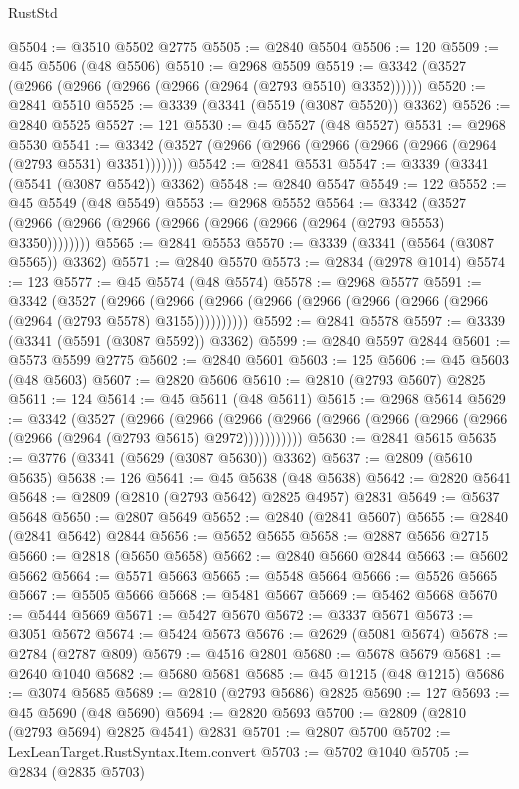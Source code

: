 \begin{lexlean}{RustStd}
\begin{coremodule}
@5504 := @3510 @5502 @2775
@5505 := @2840 @5504
@5506 := 120
@5509 := @45 @5506 (@48 @5506)
@5510 := @2968 @5509
@5519 := @3342 (@3527 (@2966 (@2966 (@2966 (@2966 (@2964 (@2793 @5510) @3352))))))
@5520 := @2841 @5510
@5525 := @3339 (@3341 (@5519 (@3087 @5520)) @3362)
@5526 := @2840 @5525
@5527 := 121
@5530 := @45 @5527 (@48 @5527)
@5531 := @2968 @5530
@5541 := @3342 (@3527 (@2966 (@2966 (@2966 (@2966 (@2966 (@2964 (@2793 @5531) @3351)))))))
@5542 := @2841 @5531
@5547 := @3339 (@3341 (@5541 (@3087 @5542)) @3362)
@5548 := @2840 @5547
@5549 := 122
@5552 := @45 @5549 (@48 @5549)
@5553 := @2968 @5552
@5564 := @3342 (@3527 (@2966 (@2966 (@2966 (@2966 (@2966 (@2966 (@2964 (@2793 @5553) @3350))))))))
@5565 := @2841 @5553
@5570 := @3339 (@3341 (@5564 (@3087 @5565)) @3362)
@5571 := @2840 @5570
@5573 := @2834 (@2978 @1014)
@5574 := 123
@5577 := @45 @5574 (@48 @5574)
@5578 := @2968 @5577
@5591 := @3342
    (@3527
      (@2966 (@2966 (@2966 (@2966 (@2966 (@2966 (@2966 (@2966 (@2964 (@2793 @5578) @3155))))))))))
@5592 := @2841 @5578
@5597 := @3339 (@3341 (@5591 (@3087 @5592)) @3362)
@5599 := @2840 @5597 @2844
@5601 := @5573 @5599 @2775
@5602 := @2840 @5601
@5603 := 125
@5606 := @45 @5603 (@48 @5603)
@5607 := @2820 @5606
@5610 := @2810 (@2793 @5607) @2825
@5611 := 124
@5614 := @45 @5611 (@48 @5611)
@5615 := @2968 @5614
@5629 := @3342
    (@3527
      (@2966
        (@2966
          (@2966 (@2966 (@2966 (@2966 (@2966 (@2966 (@2966 (@2964 (@2793 @5615) @2972)))))))))))
@5630 := @2841 @5615
@5635 := @3776 (@3341 (@5629 (@3087 @5630)) @3362)
@5637 := @2809 (@5610 @5635)
@5638 := 126
@5641 := @45 @5638 (@48 @5638)
@5642 := @2820 @5641
@5648 := @2809 (@2810 (@2793 @5642) @2825 @4957) @2831
@5649 := @5637 @5648
@5650 := @2807 @5649
@5652 := @2840 (@2841 @5607)
@5655 := @2840 (@2841 @5642) @2844
@5656 := @5652 @5655
@5658 := @2887 @5656 @2715
@5660 := @2818 (@5650 @5658)
@5662 := @2840 @5660 @2844
@5663 := @5602 @5662
@5664 := @5571 @5663
@5665 := @5548 @5664
@5666 := @5526 @5665
@5667 := @5505 @5666
@5668 := @5481 @5667
@5669 := @5462 @5668
@5670 := @5444 @5669
@5671 := @5427 @5670
@5672 := @3337 @5671
@5673 := @3051 @5672
@5674 := @5424 @5673
@5676 := @2629 (@5081 @5674)
@5678 := @2784 (@2787 @809)
@5679 := @4516 @2801
@5680 := @5678 @5679
@5681 := @2640 @1040
@5682 := @5680 @5681
@5685 := @45 @1215 (@48 @1215)
@5686 := @3074 @5685
@5689 := @2810 (@2793 @5686) @2825
@5690 := 127
@5693 := @45 @5690 (@48 @5690)
@5694 := @2820 @5693
@5700 := @2809 (@2810 (@2793 @5694) @2825 @4541) @2831
@5701 := @2807 @5700
@5702 := LexLeanTarget.RustSyntax.Item.convert
@5703 := @5702 @1040
@5705 := @2834 (@2835 @5703)

\end{coremodule}
\end{lexlean}
